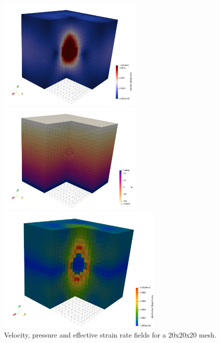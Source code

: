 \begin{center}
\includegraphics[width=7cm]{python_codes/fieldstone_11/results/vel}
\includegraphics[width=7cm]{python_codes/fieldstone_11/results/press}
\includegraphics[width=8cm]{python_codes/fieldstone_11/results/sr}\\
{\captionfont Velocity, pressure and effective strain rate fields for a 20x20x20 mesh.}
\end{center}
